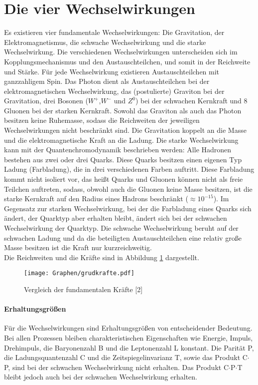 \documentclass[twoside,colorback,accentcolor=tud4c,11pt]{tudreport}
\begin{document}
\section{Die vier Wechselwirkungen}
Es existieren vier fundamentale Wechselwirkungen: Die Gravitation, der Elektromagnetismus, die schwache Wechselwirkung und die starke Wechselwirkung. 
Die verschiedenen Wechselwirkungen unterscheiden sich im Kopplungsmechanismus und den Austauschteilchen, und somit in der Reichweite und Stärke. Für jede Wechselwirkung existieren Austauschteilchen mit ganzzahligem Spin. Das Photon dient als Austauschteilchen bei der elektromagnetischen Wechselwirkung, das (postulierte) Graviton bei der Gravitation, drei Bosonen ($W^+$,$W^-$ und $Z^0$) bei der schwachen Kernkraft und 8 Gluonen bei der starken Kernkraft. Sowohl das Graviton als auch das Photon besitzen keine Ruhemasse, sodass die Reichweiten der jeweiligen Wechselwirkungen nicht beschränkt sind. Die Gravitation koppelt an die Masse und die elektromagnetische Kraft an die Ladung. Die starke Wechselwirkung kann mit der Quantenchromodynamik beschrieben werden: Alle Hadronen bestehen aus zwei oder drei Quarks. Diese Quarks besitzen einen eigenen Typ Ladung (Farbladung), die in drei verschiedenen Farben auftritt. Diese Farbladung kommt nicht isoliert vor, das heißt Quarks und Gluonen können nicht als freie Teilchen auftreten, sodass, obwohl auch die Gluonen keine Masse besitzen, ist die starke Kernkraft auf den Radius eines Hadrons beschränkt ($\approx 10^{-15}$). Im Gegensatz zur starken Wechselwirkung, bei der die Farbladung
eines Quarks sich ändert, der Quarktyp aber erhalten
bleibt, ändert sich bei der schwachen Wechselwirkung der
Quarktyp. Die schwache Wechselwirkung beruht auf der schwachen Ladung und da die beteiligten Austauschteilchen eine relativ große Masse besitzen ist die Kraft nur kurzreichweitig. \\ Die Reichweiten und die Kräfte sind in Abbildung \ref{V_2.2} dargestellt.
\begin{figure}[H]
\centering
   	\begin{minipage}[b]{0.6\textwidth}
   	\texttt{[image: Graphen/grudkrafte.pdf]}
   	\caption{Vergleich der fundamentalen Kräfte [2]}
  	\label{V_2.2}
   	\end{minipage}
\end{figure}


\paragraph{Erhaltungsgrößen}
Für die Wechselwirkungen sind Erhaltungsgrößen von entscheidender Bedeutung. Bei allen Prozessen bleiben charakteristischen Eigenschaften wie Energie, Impuls, Drehimpuls, die Baryonenzahl B und die Leptonenzahl
L konstant. Die Parität P, die Ladungsquantenzahl C und die Zeitspiegelinvarianz T, sowie das Produkt C$\cdot$P, sind bei der schwachen Wechselwirkung nicht erhalten. Das Produkt C$\cdot$P$\cdot$T bleibt jedoch auch bei der schwachen Wechselwirkung erhalten.
\end{document}
